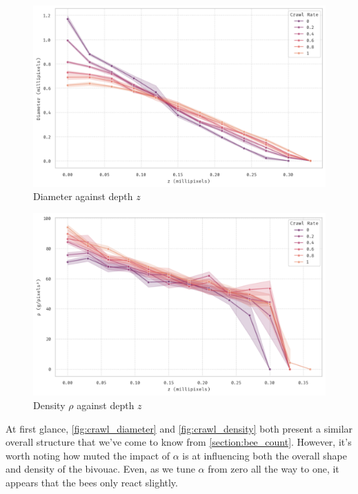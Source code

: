 \documentclass[a4paper,10pt]{article}
\begin{document}
\begin{multicols}{2}
    \begin{figure}[H]
        \centering
        \includegraphics[width=\linewidth]{crawl_diameter.pdf}
        \caption{Diameter against depth $z$}
        \label{fig:crawl_diameter}
    \end{figure}

    \begin{figure}[H]
        \centering
        \includegraphics[width=\linewidth]{crawl_density.pdf}
        \caption{Density $\rho$ against depth $z$}
        \label{fig:crawl_density}
    \end{figure}

    At first glance, \autoref{fig:crawl_diameter} and \autoref{fig:crawl_density} both
    present a similar overall structure that we've come to know from \autoref{section:bee_count}.
    However, it's worth noting how muted the impact of $\alpha$ is at influencing both the overall
    shape and density of the bivouac. Even, as we tune $\alpha$ from zero all the way to one,
    it appears that the bees only react slightly.


\end{multicols}
\end{document}
